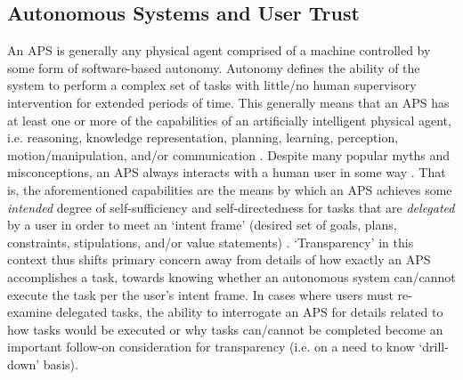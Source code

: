 \subsection{Autonomous Systems and User Trust}
An APS is generally any physical agent comprised of a machine controlled by some form of software-based autonomy. Autonomy defines the ability of the system to perform a complex set of tasks with little/no human supervisory intervention for extended periods of time. This generally means that an APS has at least one or more of the capabilities of an artificially intelligent physical agent, i.e. reasoning, knowledge representation, planning, learning, perception, motion/manipulation, and/or communication \cite{Israelsen2017-ym}. 
Despite many popular myths and misconceptions, an APS always interacts with a human user in some way \cite{Bradshaw2013-ck}. 
That is, the aforementioned capabilities are the means by which an APS achieves some \emph{intended} degree of self-sufficiency and self-directedness for tasks that are \emph{delegated} by a user in order to meet an `intent frame' (desired set of goals, plans, constraints, stipulations, and/or value statements) \cite{Miller2014-av}. `Transparency' in this context thus shifts primary concern away from details of how exactly an APS accomplishes a task, towards knowing whether an autonomous system can/cannot execute the task per the user's intent frame. 
In cases where users must re-examine delegated tasks, the ability to interrogate an APS for details related to how tasks would be executed or why tasks can/cannot be completed become an important follow-on consideration for transparency (i.e. on a need to know `drill-down' basis). 

